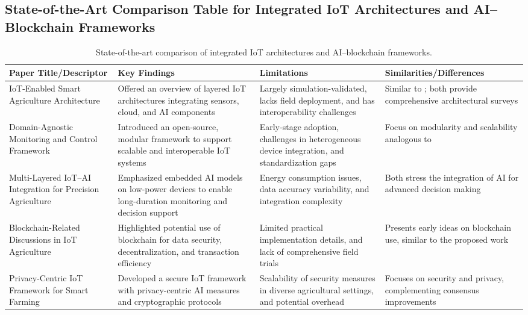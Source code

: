 \documentclass[12pt,onecolumn]{IEEEtran} %
\begin{document}
\subsection{State-of-the-Art Comparison Table for Integrated IoT Architectures and AI–Blockchain Frameworks}
\begin{table}[h]
\centering
\begin{tabularx}{\textwidth}{|l|X|X|X|}
\hline
\textbf{Paper Title/Descriptor} & \textbf{Key Findings} & \textbf{Limitations} & \textbf{Similarities/Differences} \\
\hline
IoT-Enabled Smart Agriculture Architecture \cite{quy2022iotenabledsmartagriculture} & Offered an overview of layered IoT architectures integrating sensors, cloud, and AI components & Largely simulation-validated, lacks field deployment, and has interoperability challenges & Similar to \cite{quy2022iotenabledsmartagriculture}; both provide comprehensive architectural surveys \\
\hline
Domain-Agnostic Monitoring and Control Framework \cite{senoo2023monitoringandcontrol} & Introduced an open-source, modular framework to support scalable and interoperable IoT systems & Early-stage adoption, challenges in heterogeneous device integration, and standardization gaps & Focus on modularity and scalability analogous to \cite{senoo2023monitoringandcontrol} \\
\hline
Multi-Layered IoT–AI Integration for Precision Agriculture \cite{bakthavatchalam2022iotframeworkfor} & Emphasized embedded AI models on low-power devices to enable long-duration monitoring and decision support & Energy consumption issues, data accuracy variability, and integration complexity & Both stress the integration of AI for advanced decision making \\
\hline
Blockchain-Related Discussions in IoT Agriculture \cite{quy2022iotenabledsmartagriculture} & Highlighted potential use of blockchain for data security, decentralization, and transaction efficiency & Limited practical implementation details, and lack of comprehensive field trials & Presents early ideas on blockchain use, similar to the proposed work \\
\hline
Privacy-Centric IoT Framework for Smart Farming \cite{rahaman2024privacycentricaiand} & Developed a secure IoT framework with privacy-centric AI measures and cryptographic protocols & Scalability of security measures in diverse agricultural settings, and potential overhead & Focuses on security and privacy, complementing consensus improvements \\
\hline
\end{tabularx}
\caption{State-of-the-art comparison of integrated IoT architectures and AI–blockchain frameworks.}
\label{tab:summary2}
\end{table}
\end{document}
